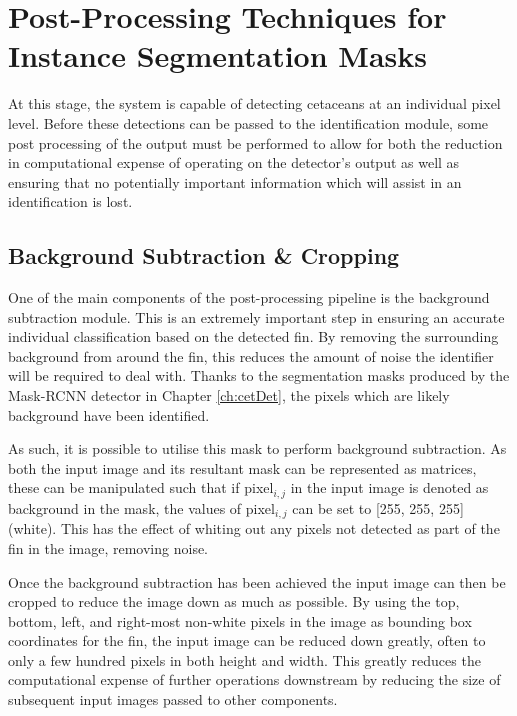 \chapter{Post-Processing Techniques for Instance Segmentation Masks}\label{ch:postProcessing}

At this stage, the system is capable of detecting cetaceans at an individual pixel level. Before these detections can be passed to the identification module, some post processing of the output must be performed to allow for both the reduction in computational expense of operating on the detector's output as well as ensuring that no potentially important information which will assist in an identification is lost. 


\section{Background Subtraction \& Cropping}\label{ch:postProcessing,sec:bgExtraction}

One of the main components of the post-processing pipeline is the background subtraction module. This is an extremely important step in ensuring an accurate individual classification based on the detected fin. By removing the surrounding background from around the fin, this reduces the amount of noise the identifier will be required to deal with. Thanks to the segmentation masks produced by the Mask-RCNN detector \cite{he_mask_2017} in Chapter \ref{ch:cetDet}, the pixels which are likely background have been identified.

As such, it is possible to utilise this mask to perform background subtraction. As both the input image and its resultant mask can be represented as matrices, these can be manipulated such that if pixel$_{i, j}$ in the input image is denoted as background in the mask, the values of pixel$_{i, j}$ can be set to [255, 255, 255] (white). This has the effect of whiting out any pixels not detected as part of the fin in the image, removing noise. 

Once the background subtraction has been achieved the input image can then be cropped to reduce the image down as much as possible. By using the top, bottom, left, and right-most non-white pixels in the image as bounding box coordinates for the fin, the input image can be reduced down greatly, often to only a few hundred pixels in both height and width. This greatly reduces the computational expense of further operations downstream by reducing the size of subsequent input images passed to other components. 

